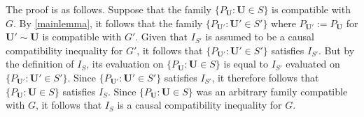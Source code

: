 
The proof is as follows.  Suppose that the family $\{ P_{\bm{U}} : \bm{U} \in S\}$ is compatible with $G$.  By \cref{mainlemma}, it follows that the family $ \{ P_{\bm{U}'} : \bm{U}' \in S'\}$ where $P_{\bm{U}'}:= P_{\bm{U}}$ for $\bm{U}' \sim \bm{U}$  is compatible with $G'$.  Given that $I_{S'}$ is assumed to be a causal compatibility inequality for $G'$, it follows that $\{ P_{\bm{U}'} : \bm{U}' \in S'\}$ satisfies $I_{S'}$.  But by the definition of $I_{S}$, its evaluation on $\{ P_{\bm{U}} : \bm{U} \in S\}$ is equal to $I_{S'}$ evaluated on $\{ P_{\bm{U}'} : \bm{U}' \in S'\}$. Since $\{ P_{\bm{U}'} : \bm{U}' \in S'\}$ satisfies $I_{S'}$, it therefore follows that $\{ P_{\bm{U}} : \bm{U} \in S\}$ satisfies $I_{S}$. Since $\{ P_{\bm{U}} : \bm{U}\in S\}$ was an arbitrary family compatible with $G$, it follows that $I_{S}$ is a causal compatibility inequality for $G$.  



